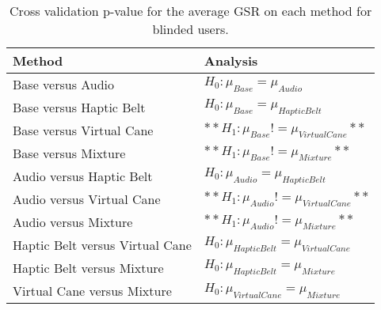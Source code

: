 
\begin{table}[!htb]
\centering
\caption{Cross validation p-value for the average GSR on each method for blinded users.}
\label{tab:lsd_gsr}
\begin{tabular}{ll}
\toprule
                         Method &                                      Analysis \\
\midrule
              Base versus Audio &               $H_{0} : \mu_{Base} = \mu_{Audio}$ \\
        Base versus Haptic Belt &         $H_{0} : \mu_{Base} = \mu_{Haptic Belt}$ \\
       Base versus Virtual Cane &      $**H_{1} : \mu_{Base} != \mu_{Virtual Cane}**$ \\
            Base versus Mixture &           $**H_{1} : \mu_{Base} != \mu_{Mixture}**$ \\
       Audio versus Haptic Belt &        $H_{0} : \mu_{Audio} = \mu_{Haptic Belt}$ \\
      Audio versus Virtual Cane &     $**H_{1} : \mu_{Audio} != \mu_{Virtual Cane}**$ \\
           Audio versus Mixture &          $**H_{1} : \mu_{Audio} != \mu_{Mixture}**$ \\
Haptic Belt versus Virtual Cane & $H_{0} : \mu_{Haptic Belt} = \mu_{Virtual Cane}$ \\
     Haptic Belt versus Mixture &      $H_{0} : \mu_{Haptic Belt} = \mu_{Mixture}$ \\
    Virtual Cane versus Mixture &     $H_{0} : \mu_{Virtual Cane} = \mu_{Mixture}$ \\
\bottomrule
\end{tabular}
\end{table}


